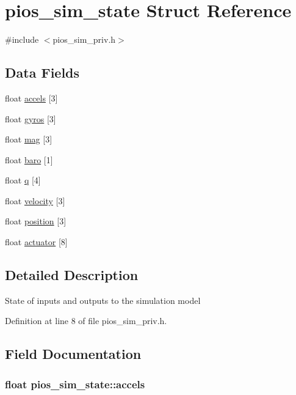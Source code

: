 \hypertarget{structpios__sim__state}{\section{pios\-\_\-sim\-\_\-state Struct Reference}
\label{structpios__sim__state}
}


{\ttfamily \#include $<$pios\-\_\-sim\-\_\-priv.\-h$>$}

\subsection*{Data Fields}
\begin{DoxyCompactItemize}
\item 
float \hyperlink{structpios__sim__state_a75b4660348cabdcd10e938c371b03c5f}{accels} \mbox{[}3\mbox{]}
\item 
float \hyperlink{structpios__sim__state_a4f14d581cd35e88fd69e425af85cf250}{gyros} \mbox{[}3\mbox{]}
\item 
float \hyperlink{structpios__sim__state_a4c78038dfaebbd96ed3705e53a6187e0}{mag} \mbox{[}3\mbox{]}
\item 
float \hyperlink{structpios__sim__state_a94e7d90c9324c1ba57dc317f196c6cb7}{baro} \mbox{[}1\mbox{]}
\item 
float \hyperlink{structpios__sim__state_a45c228037b6d97d3a0b7fffd4972112b}{q} \mbox{[}4\mbox{]}
\item 
float \hyperlink{structpios__sim__state_a879a3a3ee4d606b373d919eb4e1ad458}{velocity} \mbox{[}3\mbox{]}
\item 
float \hyperlink{structpios__sim__state_a48c9b069fe73f0cfd18111e603fe126f}{position} \mbox{[}3\mbox{]}
\item 
float \hyperlink{structpios__sim__state_a55774b00ece7f3e8838463f134d76c31}{actuator} \mbox{[}8\mbox{]}
\end{DoxyCompactItemize}


\subsection{Detailed Description}
State of inputs and outputs to the simulation model 

Definition at line 8 of file pios\-\_\-sim\-\_\-priv.\-h.



\subsection{Field Documentation}
\hypertarget{structpios__sim__state_a75b4660348cabdcd10e938c371b03c5f}{
\subsubsection[{accels}]{\setlength{\rightskip}{0pt plus 5cm}float pios\-\_\-sim\-\_\-state\-::accels}}\label{structpios__sim__state_a75b4660348cabdcd10e938c371b03c5f}


